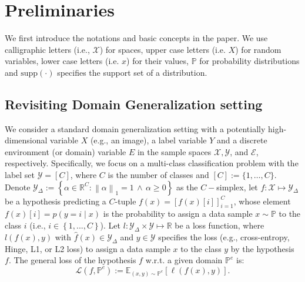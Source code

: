 \section{Preliminaries}
We first introduce the notations and basic concepts in the paper. We use calligraphic letters (i.e., $\mathcal{X}$) for spaces, upper case letters (i.e. $X$) for random variables, lower case letters (i.e. $x$) for their values, $\mathbb{P}$ for probability distributions and $\text{supp}(\cdot)$ specifies the support set of a distribution.


\subsection{Revisiting Domain Generalization setting}


We consider a standard domain generalization setting with a potentially high-dimensional variable $X$ (e.g., an image), a label variable $Y$ and a discrete environment (or domain)
variable $E$ in the sample spaces $\mathcal{X}, \mathcal{Y}$, and $\mathcal{E}$, respectively. Specifically, we focus on a multi-class classification problem with the label set $\mathcal{Y}=\left[C\right]$,
where $C$ is the number of classes and $\left[C\right]:=\{1,\ldots,C\}$. Denote $\mathcal{Y}_{\Delta}:=\left\{ \alpha\in\mathbb{R}^{C}:\left \| \alpha \right \|_{1}=1\,\wedge\,\alpha\geq 0\right\} $
as the $C-$simplex, let $f:\mathcal{X}\mapsto\mathcal{Y}_{\Delta}$
be a hypothesis predicting a $C$-tuple $f\left(x\right)=\left[f\left(x\right)[i]\right]_{i=1}^{C}$,
whose element $f\left(x\right)[i]=p\left(y=i\mid x\right)$ 
is the probability to assign a data sample $x\sim\mathbb{P}$
to the class $i$ (i.e., $i\in\left\{ 1,...,C\right\} $). Let $l:\mathcal{Y}_{\Delta}\times\mathcal{Y}\mapsto\mathbb{R}$ be
a loss function, where $l\left(f\left(x\right),y\right)$ with
$\hat{f}\left(x\right)\in\mathcal{Y}_{\Delta}$ and $y\in\mathcal{Y}$
specifies the loss (e.g., cross-entropy, Hinge, L1, or L2 loss) to
assign a data sample $x$ to the class $y$ by the hypothesis $f$. The general 
loss of the hypothesis $f$ w.r.t. a given domain $\mathbb{P}^e$ is:
\begin{equation}
\mathcal{L}\left(f,\mathbb{P}^e\right):=\mathbb{E}_{\left(x,y\right)\sim\mathbb{P}^e}\left[\ell\left(f\left(x\right),y\right)\right].   
\end{equation}

